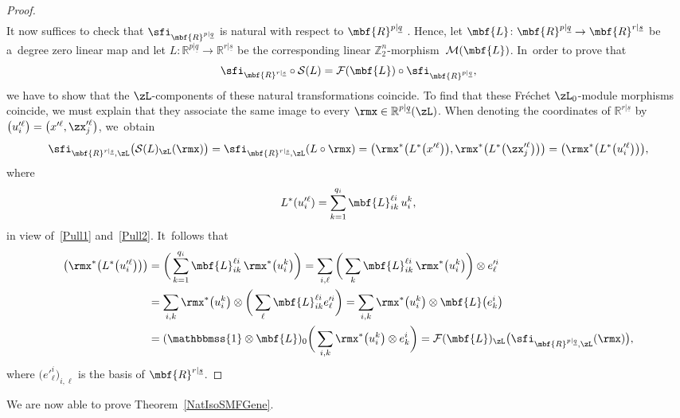 \documentclass[10pt,a4paper]{amsart}
\newcommand{\Id}{\mathbbmss{1}}
\newcommand{\R}{{\mathbb R}}
\newcommand{\Z}{{\mathbb Z}}
\def\ul{\underline}
\def\cM{\cal M}
\def\cF{\mathcal{F}}
\def\cM{\mathcal{M}}
\def\ul{\underline}
\newcommand{\0}{\otimes}
\newcommand{\z}{\Z_2^n}
\numberwithin{equation}{section}
\providecommand{\cal}{\mathcal}
\begin{document}
\begin{proof}
\begin{gather*}
\end{gather*}
It now suffices to check that $\sfi_{\mbf{R}^{p|\ul q}}$ is natural with respect to $\mbf{R}^{p|\ul q}$ . Hence, let $\mbf{L}\colon \mbf{R}^{p|\ul q}\to\mbf{R}^{r|\ul s}$ be a~degree zero linear map and let $L\colon \R^{p|\ul q}\to\R^{r|\ul s}$ be the corresponding linear $\z$-mor\-phism~$\cM(\mbf{L})$. In~order to prove that
\begin{gather}\label{NatI}
\sfi_{\mbf{R}^{r|\ul s}}\circ\mathcal{S}(L)=\cF(\mbf{L})\circ\sfi_{\mbf{R}^{p|\ul q}},
\end{gather}
we have to show that the $\zL$-components of these natural transformations coincide. To find that these Fr\'echet $\zL_0$-module morphisms coincide, we must explain that they associate the same image to every $\rmx\in\R^{p|\ul q}(\zL)$. When denoting the coordinates of $\R^{r|\ul s}$ by $\big(u'^\ell_i\big)=\big(x'^\ell,\zx'^\ell_j\big)$, we~obtain
\[
\sfi_{\mbf{R}^{r|\ul s},\zL}\big(\mathcal{S}(L)_\zL(\rmx)\big)=\sfi_{\mbf{R}^{r|\ul s},\zL}(L\circ\rmx)=\big(\rmx^*\big(L^*\big(x'^\ell\big)\big), \rmx^*\big(L^*\big(\zx'^{\ell}_j\big)\big)\big)=\big(\rmx^*\big(L^*\big(u'^\ell_i\big)\big)\big),
\]
where
\[
L^*(u'^{\ell}_i)=\sum_{k=1}^{q_i} \mbf{L}^{\ell i}_{i k}\,u^k_i,
\]
in view of~\eqref{Pull1} and~\eqref{Pull2}. It~follows that
\begin{align*}
\big(\rmx^*\big(L^*\big(u'^\ell_i\big)\big)\big)&=\bigg(\sum_{k=1}^{q_i} \mbf{L}^{\ell i}_{i k}\,\rmx^*\big(u^k_i\big)\bigg)=\sum_{i,\ell}\bigg(\sum_k\mbf{L}^{\ell i}_{ik}\,\rmx^*\big(u_i^k\big)\bigg)\0 e'^i_\ell
\\&
=\sum_{i,k}\rmx^*\big(u_i^k\big)\0 \bigg(\sum_\ell\mbf{L}^{\ell i}_{ik}e'^i_\ell\bigg)
=\sum_{i,k}\rmx^*\big(u_i^k\big)\0 \mbf{L}\big(e^i_k\big)
\\
&=(\Id\0\mbf{L})_0\bigg(\sum_{i,k}\rmx^*\big(u_i^k\big)\0 e^i_k\bigg)=\cF(\mbf{L})_\zL\big(\sfi_{\mbf{R}^{p|\ul q},\zL}(\rmx)\big),
\end{align*}
where $\big(e'^i_\ell\big)_{i,\ell}$ is the basis of $\mbf{R}^{r|\ul s}$.
\end{proof}

\newcommand{\cI}{\mathcal{I}}

We are now able to prove Theorem~\ref{NatIsoSMFGene}.
\end{document}
